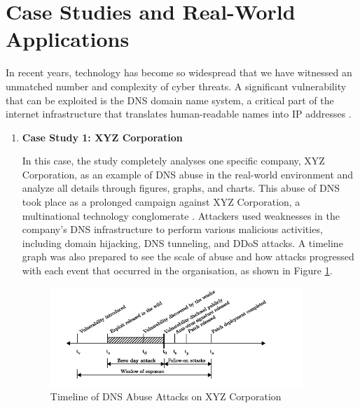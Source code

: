 \section{Case Studies and Real-World Applications}

In recent years, technology has become so widespread that we have witnessed an unmatched number and complexity of cyber threats. A significant vulnerability that can be exploited is the DNS domain name system, a critical part of the internet infrastructure that translates human-readable names into IP addresses \cite{kumari2021sac115}. 

\begin{enumerate} 
\item\textbf{ Case Study 1: XYZ Corporation }

In this case, the study completely analyses one specific company, XYZ Corporation, as an example of DNS abuse in the real-world environment and analyze all details through figures, graphs, and charts. This abuse of DNS took place as a prolonged campaign against XYZ Corporation, a multinational technology conglomerate \cite{mohammed2021network}. Attackers used weaknesses in the company's DNS infrastructure to perform various malicious activities, including domain hijacking, DNS tunneling, and DDoS attacks. A timeline graph was also prepared to see the scale of abuse and how attacks progressed with each event that occurred in the organisation, as shown in Figure \ref{fig:figureOne}.

\captionsetup{font= footnotesize}
\begin{figure}[H]
\centering
\includegraphics[width=0.9\textwidth]{background/XYZ1.png}
\caption{Timeline of DNS Abuse Attacks on XYZ Corporation}
\label{fig:figureOne}
\end{figure}


\end{enumerate}
